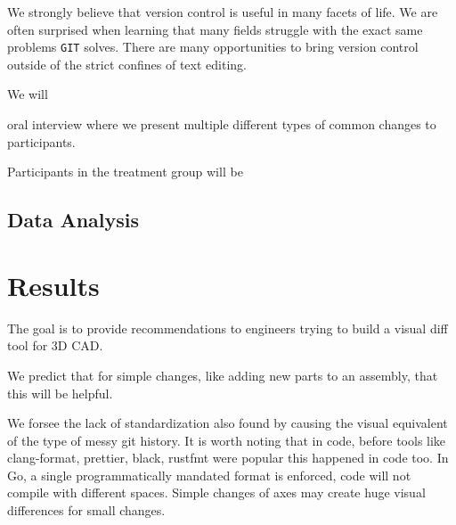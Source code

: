 \documentclass[sigconf,]{acmart}
\begin{document}





We strongly believe that version control is useful in many facets of life.
We are often surprised when learning that many fields struggle with the exact same problems \texttt{GIT} solves.
There are many opportunities to bring version control outside of the strict confines of text editing.





We will

oral interview where we present multiple different types of common changes to participants.

Participants in the treatment group will be

\subsection{Data Analysis}

\section{Results}

The goal is to provide recommendations to engineers trying to build a visual diff tool for 3D CAD.

We predict that for simple changes, like adding new parts to an assembly, that this will be helpful.

We forsee the lack of standardization also found by \citet{cheng2023age} causing the visual equivalent of the type of messy git history.
It is worth noting that in code, before tools like clang-format, prettier, black, rustfmt were popular this happened in code too.
In Go, a single programmatically mandated format is enforced, code will not compile with different spaces.
Simple changes of axes may create huge visual differences for small changes.
\end{document}

